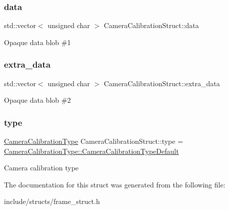 \subsubsection{\texorpdfstring{data}{data}}
{\footnotesize\ttfamily std\+::vector$<$ unsigned char $>$ Camera\+Calibration\+Struct\+::data}

Opaque data blob \#1 \mbox{\label{structmoetsi_1_1ssp_1_1CameraCalibrationStruct_acf795c6f1fabdd1e825d562d25a2dc73}} 
\subsubsection{\texorpdfstring{extra\+\_\+data}{extra\_data}}
{\footnotesize\ttfamily std\+::vector$<$ unsigned char $>$ Camera\+Calibration\+Struct\+::extra\+\_\+data}

Opaque data blob \#2 \mbox{\label{structmoetsi_1_1ssp_1_1CameraCalibrationStruct_adcb025ea2cc5b2f30574318300f7b284}} 
\subsubsection{\texorpdfstring{type}{type}}
{\footnotesize\ttfamily \hyperlink{namespacemoetsi_1_1ssp_a1f51291db51233dc5865d42e6ee36ef8}{Camera\+Calibration\+Type} Camera\+Calibration\+Struct\+::type = \hyperlink{namespacemoetsi_1_1ssp_a1f51291db51233dc5865d42e6ee36ef8ac32f0bb1b309dd3992d8e37bfaa00c78}{Camera\+Calibration\+Type\+::\+Camera\+Calibration\+Type\+Default}}

Camera calibration type 

The documentation for this struct was generated from the following file\+:\begin{DoxyCompactItemize}
\item 
include/structs/frame\+\_\+struct.\+h\end{DoxyCompactItemize}
